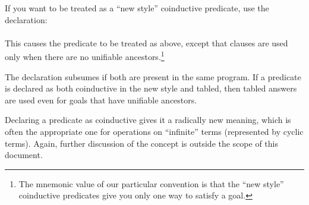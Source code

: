 If you want  to be treated as a ``new style'' coinductive predicate,
use the declaration:\\
\ind{}%
\label{dir:coinductive1}\\
This causes the predicate to be treated as above, except that clauses are used
only when there are no unifiable ancestors.\footnote{%
  The mnemonic value of our particular convention is that the ``new style''
  coinductive predicates give you only one way to satisfy a goal.}

The declaration  subsumes 
if both are present in the same program.  If a predicate is declared as both
coinductive in the new style and tabled, then tabled answers are used even for
goals that have unifiable ancestors.

Declaring a predicate as coinductive gives it a radically new meaning, which is
often the appropriate one for operations on ``infinite'' terms (represented by
cyclic terms).  Again, further discussion of the concept is outside the scope of
this document.
